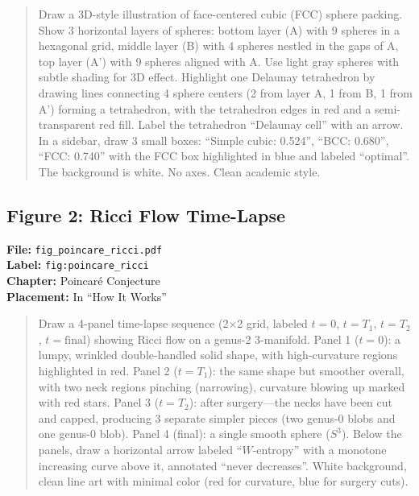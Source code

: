\begin{quote}
Draw a 3D-style illustration of face-centered cubic (FCC) sphere packing. Show 3 horizontal layers of spheres: bottom layer (A) with 9 spheres in a hexagonal grid, middle layer (B) with 4 spheres nestled in the gaps of A, top layer (A') with 9 spheres aligned with A. Use light gray spheres with subtle shading for 3D effect. Highlight one Delaunay tetrahedron by drawing lines connecting 4 sphere centers (2 from layer A, 1 from B, 1 from A') forming a tetrahedron, with the tetrahedron edges in red and a semi-transparent red fill. Label the tetrahedron ``Delaunay cell'' with an arrow. In a sidebar, draw 3 small boxes: ``Simple cubic: 0.524'', ``BCC: 0.680'', ``FCC: 0.740'' with the FCC box highlighted in blue and labeled ``optimal''. The background is white. No axes. Clean academic style.
\end{quote}

\subsection*{Figure 2: Ricci Flow Time-Lapse}
\textbf{File:} \texttt{fig\_poincare\_ricci.pdf} \\
\textbf{Label:} \texttt{fig:poincare\_ricci} \\
\textbf{Chapter:} Poincaré Conjecture \\
\textbf{Placement:} In ``How It Works''

\begin{quote}
Draw a 4-panel time-lapse sequence (2$\times$2 grid, labeled $t{=}0$, $t{=}T_1$, $t{=}T_2$, $t{=}\text{final}$) showing Ricci flow on a genus-2 3-manifold. Panel 1 ($t{=}0$): a lumpy, wrinkled double-handled solid shape, with high-curvature regions highlighted in red. Panel 2 ($t{=}T_1$): the same shape but smoother overall, with two neck regions pinching (narrowing), curvature blowing up marked with red stars. Panel 3 ($t{=}T_2$): after surgery---the necks have been cut and capped, producing 3 separate simpler pieces (two genus-0 blobs and one genus-0 blob). Panel 4 (final): a single smooth sphere ($S^3$). Below the panels, draw a horizontal arrow labeled ``$W$-entropy'' with a monotone increasing curve above it, annotated ``never decreases''. White background, clean line art with minimal color (red for curvature, blue for surgery cuts).
\end{quote}

